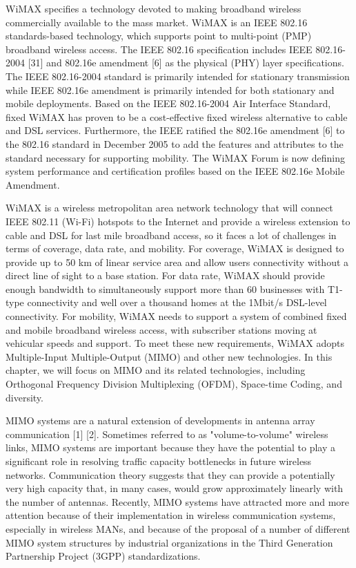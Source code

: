 WiMAX specifies a technology devoted to making broadband wireless
commercially available to the mass market. WiMAX is an IEEE 802.16
standards-based technology, which supports point to multi-point
(PMP) broadband wireless access. The IEEE 802.16 specification
includes IEEE 802.16-2004 [31] and 802.16e amendment [6] as the
physical (PHY) layer specifications. The IEEE 802.16-2004 standard
is primarily intended for stationary transmission while IEEE 802.16e
amendment is primarily intended for both stationary and mobile
deployments. Based on the IEEE 802.16-2004 Air Interface Standard,
fixed WiMAX has proven to be a cost-effective fixed wireless
alternative to cable and DSL services. Furthermore, the IEEE
ratified the 802.16e amendment [6] to the 802.16 standard in
December 2005 to add the features and attributes to the standard
necessary for supporting mobility. The WiMAX Forum is now defining
system performance and certification profiles based on the IEEE
802.16e Mobile Amendment.

WiMAX is a wireless metropolitan area network technology that will
connect IEEE 802.11 (Wi-Fi) hotspots to the Internet and provide a
wireless extension to cable and DSL for last mile broadband access,
so it faces a lot of challenges in terms of coverage, data rate, and
mobility. For coverage, WiMAX is designed to provide up to 50 km of
linear service area and allow users connectivity without a direct
line of sight to a base station. For data rate, WiMAX should provide
enough bandwidth to simultaneously support more than 60 businesses
with T1-type connectivity and well over a thousand homes at the
1Mbit/s DSL-level connectivity. For mobility, WiMAX needs to support
a system of combined fixed and mobile broadband wireless access,
with subscriber stations moving at vehicular speeds and support. To
meet these new requirements, WiMAX adopts Multiple-Input
Multiple-Output (MIMO) and other new technologies. In this chapter,
we will focus on MIMO and its related technologies, including
Orthogonal Frequency Division Multiplexing (OFDM), Space-time
Coding, and diversity.

MIMO systems are a natural extension of developments in antenna
array communication [1] [2]. Sometimes referred to as
"volume-to-volume" wireless links, MIMO systems are important
because they have the potential to play a significant role in
resolving traffic capacity bottlenecks in future wireless networks.
Communication theory suggests that they can provide a potentially
very high capacity that, in many cases, would grow approximately
linearly with the number of antennas. Recently, MIMO systems have
attracted more and more attention because of their implementation in
wireless communication systems, especially in wireless MANs, and
because of the proposal of a number of different MIMO system
structures by industrial organizations in the Third Generation
Partnership Project (3GPP) standardizations.

